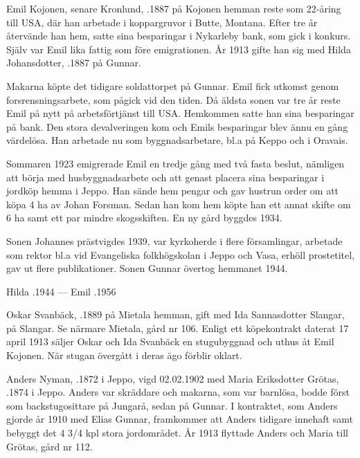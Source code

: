 %
Emil Kojonen, senare Kronlund, .1887 på Kojonen hemman reste som 22-åring till USA, där han arbetade i koppargruvor i Butte, Montana. Efter tre år återvände han hem, satte sina besparingar i Nykarleby bank, som gick i konkurs. Själv var Emil lika fattig som före emigrationen. År 1913 gifte han sig med Hilda Johansdotter, .1887 på Gunnar.
\begin{jhchildren}
  \item {}
  \item {}
\end{jhchildren}

Makarna köpte det tidigare soldattorpet på Gunnar. Emil fick utkomst genom forsrensningsarbete, som pågick vid den tiden. Då äldsta sonen var tre år reste Emil på nytt på arbetsförtjänst till USA. Hemkommen satte han sina besparingar på bank. Den stora devalveringen kom och Emils besparingar blev ännu en gång värdelösa. Han arbetade nu som byggnadsarbetare, bl.a på Keppo och i Oravais.

Sommaren 1923 emigrerade Emil en tredje gång med två fasta beslut, nämligen att börja med husbyggnadsarbete och att genast placera sina besparingar i jordköp hemma i Jeppo. Han sände hem pengar och gav hustrun order om att köpa 4 ha av Johan Forsman. Sedan han kom hem köpte han ett annat skifte om 6 ha samt ett par mindre skogsskiften. En ny gård byggdes 1934.

Sonen Johannes prästvigdes 1939, var kyrkoherde i flere församlingar, arbetade som rektor bl.a vid  Evangeliska folkhögskolan i Jeppo och Vasa, erhöll prostetitel, gav ut flere publikationer. Sonen Gunnar övertog hemmanet 1944.

Hilda .1944  ---  Emil .1956


%
Oskar Svanbäck, .1889 på Mietala hemman, gift med Ida Sannasdotter Slangar,  på Slangar. Se närmare Mietala, gård nr 106. Enligt ett köpekontrakt daterat 17 april 1913 säljer Oskar och Ida Svanbäck en stugubyggnad och uthus åt Emil Kojonen. När stugan övergått i deras ägo förblir oklart.


%
Anders Nyman, .1872 i Jeppo, vigd 02.02.1902 med Maria Eriksdotter Grötas, .1874 i Jeppo. Anders var skräddare och makarna, som var barnlösa, bodde först som backstugosittare på Jungarå, sedan på Gunnar. I kontraktet, som Anders gjorde år 1910 med Elias Gunnar, framkommer att Anders tidigare innehaft samt bebyggt det 4 3/4 kpl stora jordområdet. År 1913 flyttade Anders och Maria till Grötas, gård nr 112.


